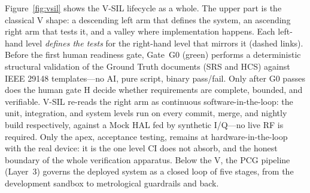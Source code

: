 \documentclass[11pt,a4paper]{article}
\begin{document}
Figure~\ref{fig:vsil} shows the V-SIL lifecycle as a whole. The upper part is the classical V shape:
a descending left arm that defines the system, an ascending right arm that tests it, and a
valley where implementation happens. Each left-hand level \emph{defines the tests} for the
right-hand level that mirrors it (dashed links). Before the first human readiness gate, Gate~G0
(green) performs a deterministic structural validation of the Ground Truth documents (SRS and
HCS) against IEEE 29148 templates---no AI, pure script, binary pass/fail. Only after G0 passes
does the human gate H decide whether requirements are complete, bounded, and verifiable.
V-SIL re-reads the right arm as continuous
software-in-the-loop: the unit, integration, and system levels run on every commit, merge, and
nightly build respectively, against a Mock HAL fed by synthetic I/Q---no live RF is required.
Only the apex, acceptance testing, remains at hardware-in-the-loop with the real device: it is
the one level CI does not absorb, and the honest boundary of the whole verification apparatus.
Below the V, the PCG pipeline (Layer~3) governs the deployed system as a closed loop of five
stages, from the development sandbox to metrological guardrails and back.
\end{document}
